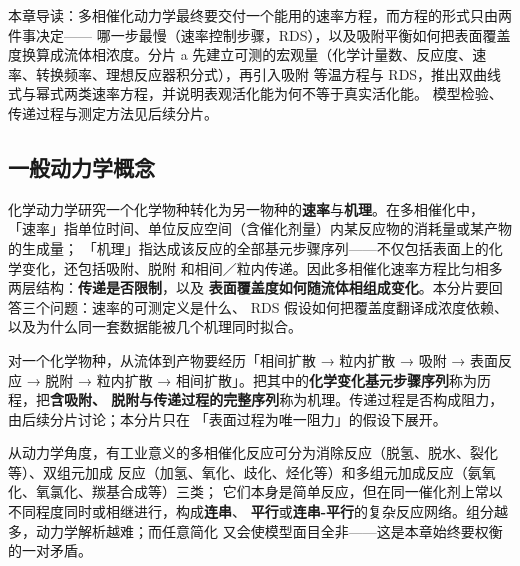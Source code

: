 
%
{本章导读：多相催化动力学最终要交付一个能用的速率方程，而方程的形式只由两件事决定——
哪一步最慢（速率控制步骤，RDS），以及吸附平衡如何把表面覆盖度换算成流体相浓度。分片 a
先建立可测的宏观量（化学计量数、反应度、速率、转换频率、理想反应器积分式），再引入吸附
等温方程与 RDS，推出双曲线式与幂式两类速率方程，并说明表观活化能为何不等于真实活化能。
模型检验、传递过程与测定方法见后续分片。}
\label{ch:10}

\subsection{一般动力学概念}

\begin{probout}
化学动力学研究一个化学物种转化为另一物种的\textbf{速率}与\textbf{机理}。在多相催化中，
「速率」指单位时间、单位反应空间（含催化剂量）内某反应物的消耗量或某产物的生成量；
「机理」指达成该反应的全部基元步骤序列——不仅包括表面上的化学变化，还包括吸附、脱附
和相间／粒内传递。因此多相催化速率方程比匀相多两层结构：\textbf{传递是否限制}，以及
\textbf{表面覆盖度如何随流体相组成变化}。本分片要回答三个问题：速率的可测定义是什么、
RDS 假设如何把覆盖度翻译成浓度依赖、以及为什么同一套数据能被几个机理同时拟合。
\end{probout}

对一个化学物种，从流体到产物要经历「相间扩散 → 粒内扩散 → 吸附 → 表面反应 → 脱附 →
粒内扩散 → 相间扩散」。把其中的\textbf{化学变化基元步骤序列}称为历程，把\textbf{含吸附、
脱附与传递过程的完整序列}称为机理。传递过程是否构成阻力，由后续分片讨论；本分片只在
「表面过程为唯一阻力」的假设下展开。

从动力学角度，有工业意义的多相催化反应可分为消除反应（脱氢、脱水、裂化等）、双组元加成
反应（加氢、氧化、歧化、烃化等）和多组元加成反应（氨氧化、氧氯化、羰基合成等）三类；
它们本身是简单反应，但在同一催化剂上常以不同程度同时或相继进行，构成\textbf{连串}、
\textbf{平行}或\textbf{连串-平行}的复杂反应网络。组分越多，动力学解析越难；而任意简化
又会使模型面目全非——这是本章始终要权衡的一对矛盾。

